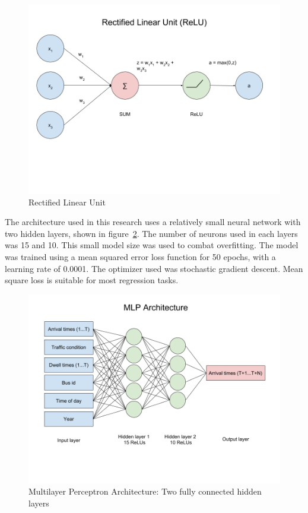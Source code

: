\begin{figure}
\includegraphics[width=\linewidth]{images/relu.png}
\caption{Rectified Linear Unit}
\label{relu}
\end{figure}
\clearpage
\newpage

The architecture used in this research uses a relatively small neural network with two hidden layers, shown in figure~\ref{mlp_architecture}.
The number of neurons used in each layers was 15 and 10.
This small model size was used to combat overfitting.
The model was trained using a mean squared error loss function for 50 epochs, with a learning rate of 0.0001.
The optimizer used was stochastic gradient descent.
Mean square loss is suitable for most regression tasks.

\begin{figure}
\includegraphics[width=\linewidth]{images/mlp_architecture.png}
\caption{Multilayer Perceptron Architecture: Two fully connected hidden layers}
\label{mlp_architecture}
\end{figure}
\clearpage
\newpage

